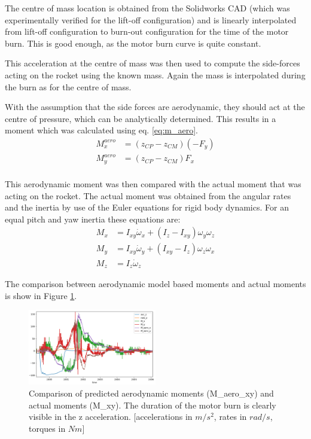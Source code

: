 The centre of mass location is obtained from the Solidworks CAD (which was experimentally verified for the lift-off configuration) and is linearly interpolated from lift-off configuration to burn-out configuration for the time of the motor burn. This is good enough, as the motor burn curve is quite constant.

This acceleration at the centre of mass was then used to compute the side-forces acting on the rocket using the known mass. Again the mass is interpolated during the burn as for the centre of mass.

With the assumption that the side forces are aerodynamic, they should act at the centre of pressure, which can be analytically determined.
This results in a moment which was calculated using eq. \ref{eq:m_aero}.
\begin{equation}
\label{eq:m_aero}
\begin{split}
    M^{aero}_x &= (z_{CP} - z_{CM}) (-F_y) \\
    M^{aero}_y &= (z_{CP} - z_{CM}) F_x \\
\end{split}
\end{equation}

This aerodynamic moment was then compared with the actual moment that was acting on the rocket.
The actual moment was obtained from the angular rates and the inertia by use of the Euler equations for rigid body dynamics. For an equal pitch and yaw inertia these equations are:
\begin{equation}
\begin{split}
    M_x &= I_{xy} \dot\omega_x + (I_z-I_{xy}) \omega_y \omega_z \\
    M_y &= I_{xy} \dot\omega_y + (I_{xy}-I_z) \omega_z \omega_x \\
    M_z &= I_{z} \dot\omega_z
\end{split}
\end{equation}


The comparison between aerodynamic model based moments and actual moments is show in Figure \ref{fig:test_flight_graph}.
\begin{figure}[h!]
    \centering
        \includegraphics[width=0.5\textwidth]{img/test_flight_graph.png}
        \caption{Comparison of predicted aerodynamic moments (M_aero_xy) and actual moments (M_xy). The duration of the motor burn is clearly visible in the z acceleration. [accelerations in $m/s^2$, rates in $rad/s$, torques in $Nm$]}
        \label{fig:test_flight_graph}
 \end{figure}

